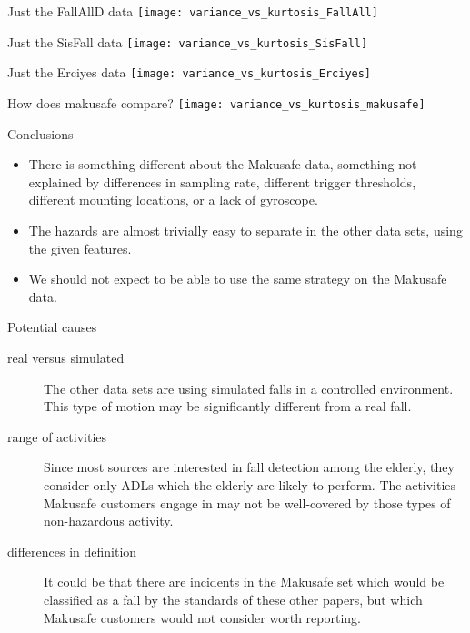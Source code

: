 \documentclass{beamer}
\begin{document}
\begin{frame}{Just the FallAllD data}
\texttt{[image: variance\_vs\_kurtosis\_FallAll]}
\end{frame}


\begin{frame}{Just the SisFall data}
\texttt{[image: variance\_vs\_kurtosis\_SisFall]}
\end{frame}

\begin{frame}{Just the Erciyes data}
\texttt{[image: variance\_vs\_kurtosis\_Erciyes]}
\end{frame}


\begin{frame}{How does makusafe compare?}
\texttt{[image: variance\_vs\_kurtosis\_makusafe]}
\end{frame}


\begin{frame}{Conclusions}
\begin{itemize}
\item There is something different about the Makusafe data, something not explained by differences in sampling rate, different trigger thresholds, different mounting locations, or a lack of gyroscope.
\item The hazards are almost trivially easy to separate in the other data sets, using the given features.
\item We should not expect to be able to use the same strategy on the Makusafe data.
\end{itemize}
\end{frame}

\begin{frame}{Potential causes}
\begin{description}
\item[real versus simulated] The other data sets are using simulated falls in a controlled environment. This type of motion may be significantly different from a real fall.
\item[range of activities] Since most sources are interested in fall detection among the elderly, they consider only ADLs which the elderly are likely to perform. The activities Makusafe customers engage in may not be well-covered by those types of non-hazardous activity.
\item[differences in definition] It could be that there are incidents in the Makusafe set which would be classified as a fall by the standards of these other papers, but which Makusafe customers would not consider worth reporting.
\end{description}
\end{frame}
\end{document}
